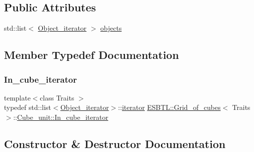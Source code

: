 \subsection*{Public Attributes}
\begin{DoxyCompactItemize}
\item 
std\+::list$<$ \hyperlink{structESBTL_1_1Grid__of__cubes_ae77665f05d6c7ae05c3d2d764df99193}{Object\+\_\+iterator} $>$ \hyperlink{structESBTL_1_1Grid__of__cubes_1_1Cube__unit_a06a4ded54f248adda693b662082b6a20}{objects}
\end{DoxyCompactItemize}


\subsection{Member Typedef Documentation}
\mbox{\label{structESBTL_1_1Grid__of__cubes_1_1Cube__unit_a9a5e21b8376bdeb122987e83f89b3c06}} 
\subsubsection{\texorpdfstring{In\+\_\+cube\+\_\+iterator}{In\_cube\_iterator}}
{\footnotesize\ttfamily template$<$class Traits $>$ \\
typedef std\+::list$<$\hyperlink{structESBTL_1_1Grid__of__cubes_ae77665f05d6c7ae05c3d2d764df99193}{Object\+\_\+iterator}$>$\+::\hyperlink{classESBTL_1_1Grid__of__cubes_1_1iterator}{iterator} \hyperlink{structESBTL_1_1Grid__of__cubes}{E\+S\+B\+T\+L\+::\+Grid\+\_\+of\+\_\+cubes}$<$ Traits $>$\+::\hyperlink{structESBTL_1_1Grid__of__cubes_1_1Cube__unit_a9a5e21b8376bdeb122987e83f89b3c06}{Cube\+\_\+unit\+::\+In\+\_\+cube\+\_\+iterator}}



\subsection{Constructor \& Destructor Documentation}
\mbox{\label{structESBTL_1_1Grid__of__cubes_1_1Cube__unit_a8ca11ade3d86e7824fc4223441e8b37c}} 
